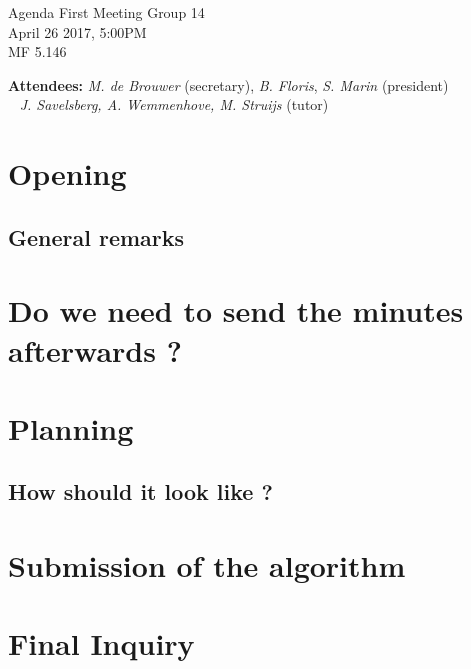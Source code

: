 \documentclass[a4paper,twoside,11pt]{article}
\title{}
\date{}
\begin{document}

\begin{center}
\Huge{Agenda First Meeting Group 14}
\\\vspace*{2mm}
\Large{April 26 2017, 5:00PM}
\\\vspace*{2mm}
\large{MF 5.146}
\\
		\end{center}

		\textbf{Attendees:} \textit{M. de Brouwer} (secretary), \textit{B. Floris}, \textit{S. Marin} (president)
\\\indent\qquad\,\,\,\,\,\qquad\quad \textit{J. Savelsberg, A. Wemmenhove, M. Struijs} (tutor)

	\section{Opening}
	\subsection*{\hspace{1.9em}General remarks}


	\section{Do we need to send the minutes afterwards ?}

	\section{Planning}
	\subsection{How should it look like ?}

	\section{Submission of the algorithm}

	\section{Final Inquiry}

	
\end{document}
